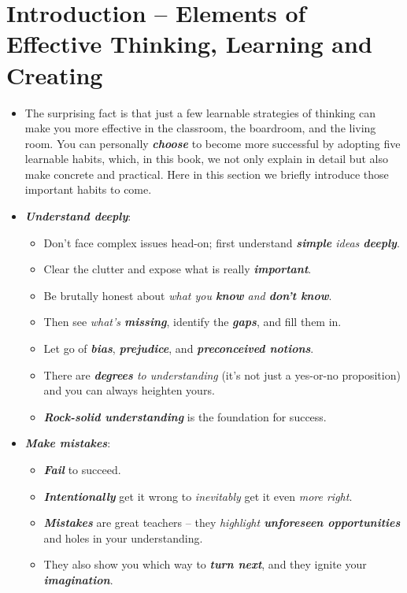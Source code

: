 \documentclass[11pt]{article}
\begin{document}
\section{Introduction -- Elements of Effective Thinking, Learning and Creating}
\begin{itemize}
\item The surprising fact is that just a few learnable strategies of thinking can make you more effective in the classroom, the boardroom, and the living room. You can personally \emph{\textbf{choose}} to become more successful by adopting five learnable habits, which, in this book, we not only explain in detail but also make concrete and practical. Here in this section we briefly introduce those important habits to come.

\item \emph{\textbf{Understand deeply}}:
\begin{itemize}
\item Don’t face complex issues head-on; first understand \emph{\textbf{simple} ideas \textbf{deeply}}. 
\item Clear the clutter and expose what is really \emph{\textbf{important}}. 
\item Be brutally honest about \emph{what you \textbf{know} and \textbf{don’t know}}. 
\item Then see \emph{what’s \textbf{missing}}, identify the \emph{\textbf{gaps}}, and fill them in. 
\item Let go of \emph{\textbf{bias}}, \emph{\textbf{prejudice}}, and \emph{\textbf{preconceived notions}}. 
\item There are \emph{\textbf{degrees} to understanding} (it’s not just a yes-or-no proposition) and you can always heighten yours. 
\item \emph{\textbf{Rock-solid understanding}} is the foundation for success.
\end{itemize}

\item \emph{\textbf{Make mistakes}}:
\begin{itemize}
\item \emph{\textbf{Fail}} to succeed. 
\item \emph{\textbf{Intentionally}} get it wrong to \emph{inevitably} get it even \emph{more right}. 
\item \emph{\textbf{Mistakes}} are great teachers -- they \emph{highlight \textbf{unforeseen opportunities}} and holes in your understanding. 
\item They also show you which way to \emph{\textbf{turn next}}, and they ignite your \emph{\textbf{imagination}}.
\end{itemize}


\end{itemize}
\end{document}
